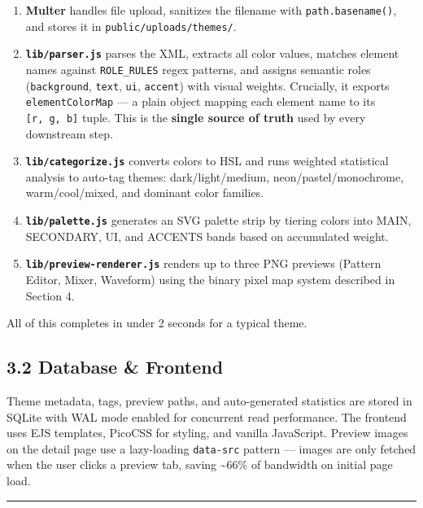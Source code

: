\documentclass[
  11pt,
  oneside]{report}
\providecommand{\tightlist}{%
  \setlength{\itemsep}{0pt}\setlength{\parskip}{0pt}}
\begin{document}
\begin{enumerate}
\def\labelenumi{\arabic{enumi}.}
\tightlist
\item
  \textbf{Multer} handles file upload, sanitizes the filename with
  \texttt{path.basename()}, and stores it in
  \texttt{public/uploads/themes/}.
\item
  \textbf{\texttt{lib/parser.js}} parses the XML, extracts all color
  values, matches element names against \texttt{ROLE\_RULES} regex
  patterns, and assigns semantic roles (\texttt{background},
  \texttt{text}, \texttt{ui}, \texttt{accent}) with visual weights.
  Crucially, it exports \texttt{elementColorMap} --- a plain object
  mapping each element name to its \texttt{{[}r,\ g,\ b{]}} tuple. This
  is the \textbf{single source of truth} used by every downstream step.
\item
  \textbf{\texttt{lib/categorize.js}} converts colors to HSL and runs
  weighted statistical analysis to auto-tag themes: dark/light/medium,
  neon/pastel/monochrome, warm/cool/mixed, and dominant color families.
\item
  \textbf{\texttt{lib/palette.js}} generates an SVG palette strip by
  tiering colors into MAIN, SECONDARY, UI, and ACCENTS bands based on
  accumulated weight.
\item
  \textbf{\texttt{lib/preview-renderer.js}} renders up to three PNG
  previews (Pattern Editor, Mixer, Waveform) using the binary pixel map
  system described in Section 4.
\end{enumerate}

All of this completes in under 2 seconds for a typical theme.

\subsection{3.2 Database \& Frontend}\label{database-frontend}

Theme metadata, tags, preview paths, and auto-generated statistics are
stored in SQLite with WAL mode enabled for concurrent read performance.
The frontend uses EJS templates, PicoCSS for styling, and vanilla
JavaScript. Preview images on the detail page use a lazy-loading
\texttt{data-src} pattern --- images are only fetched when the user
clicks a preview tab, saving \textasciitilde66\% of bandwidth on initial
page load.

\begin{center}\rule{0.5\linewidth}{0.5pt}\end{center}
\end{document}
